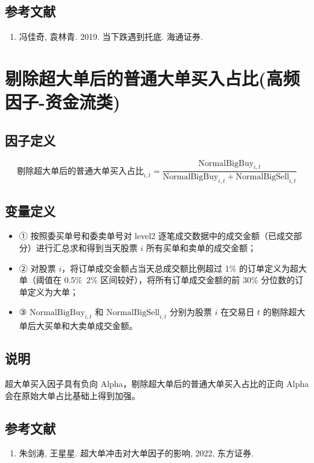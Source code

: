 \documentclass{article}
\begin{document}
\subsection{参考文献}
\begin{enumerate}
    \item 冯佳奇, 袁林青. 2019. 当下跌遇到托底. 海通证券.
\end{enumerate}

\section{剔除超大单后的普通大单买入占比(高频因子-资金流类)}

\subsection{因子定义}

\begin{equation}
    \text{剔除超大单后的普通大单买入占比}_{i,t} = \frac{\mathrm{NormalBigBuy}_{i,t}}{\mathrm{NormalBigBuy}_{i,t} + \mathrm{NormalBigSell}_{i,t}}
\end{equation}

\subsection{变量定义}
\begin{itemize}
    \item ① 按照委买单号和委卖单号对 level2 逐笔成交数据中的成交金额（已成交部分）进行汇总求和得到当天股票 \( i \) 所有买单和卖单的成交金额；
    \item ② 对股票 \( i \)，将订单成交金额占当天总成交额比例超过 1\% 的订单定义为超大单（阈值在 0.5\%~2\% 区间较好），将所有订单成交金额的前 30\% 分位数的订单定义为大单；
    \item ③ \( \mathrm{NormalBigBuy}_{i,t} \) 和 \( \mathrm{NormalBigSell}_{i,t} \) 分别为股票 \( i \) 在交易日 \( t \) 的剔除超大单后大买单和大卖单成交金额。
\end{itemize}

\subsection{说明}
超大单买入因子具有负向 Alpha，剔除超大单后的普通大单买入占比的正向 Alpha 会在原始大单占比基础上得到加强。

\subsection{参考文献}
\begin{enumerate}
    \item 朱剑涛, 王星星. 超大单冲击对大单因子的影响, 2022, 东方证券.
\end{enumerate}
\end{document}
